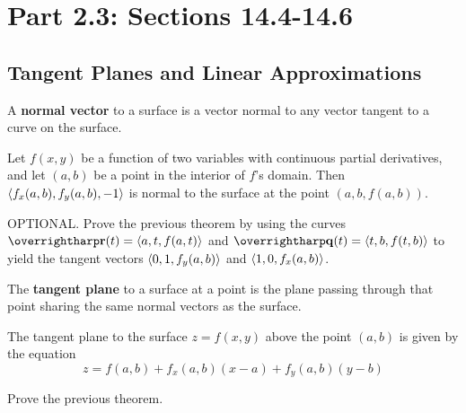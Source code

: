 \documentclass[letterpaper, twoside, 12pt]{book}
\begin{document}
\setcounter{chapter}{1}

\chapter{Part 2.3: Sections 14.4-14.6}

\setcounter{chapter}{14}
\setcounter{section}{3}

\section{Tangent Planes and Linear Approximations} %

\begin{definition}
  A \textbf{normal vector} to a surface is a vector normal to
  any vector tangent to a curve on the surface.
\end{definition}

\begin{theorem}
  Let $f(x,y)$ be a function of two variables with continuous partial
  derivatives, and let $(a,b)$ be a point in the interior of $f$'s
  domain. Then $\langle f_x(a,b),f_y(a,b),-1\rangle$ is normal to the surface
  at the point $(a,b,f(a,b))$.
\end{theorem}

          \begin{problem}
            OPTIONAL. Prove the previous theorem by using the curves
            $\vect{r}(t)=\<a,t,f(a,t)\>$ and
            $\vect{q}(t)=\<t,b,f(t,b)\>$ to yield the tangent vectors
            $\langle0,1,f_y(a,b)\rangle$ and $\langle1,0,f_x(a,b)\rangle$.
          \end{problem}

          \begin{solution}

          \end{solution}

\begin{definition}
  The \textbf{tangent plane} to a surface at a point is the plane passing
  through that point sharing the same normal vectors as the surface.
\end{definition}

\begin{theorem}
  The tangent plane to the surface $z=f(x,y)$ above the point $(a,b)$
  is given by the equation
    \[
      z = f(a,b) + f_x(a,b)(x-a)+f_y(a,b)(y-b)
    \]
\end{theorem}

          \begin{problem}
            Prove the previous theorem.
          \end{problem}
\end{document}
